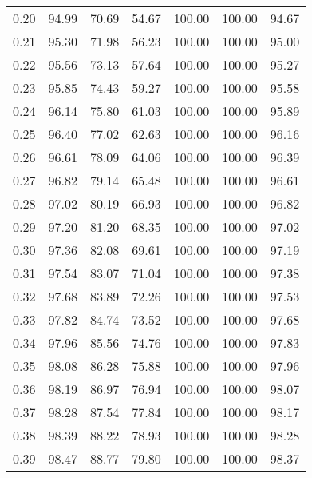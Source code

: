 \begin{tabular}{|c|c|c|c|c|c|c|}
      0.20 &     94.99 &     70.69 &      54.67 &  100.00 &     100.00 &         94.67 \\
      0.21 &     95.30 &     71.98 &      56.23 &  100.00 &     100.00 &         95.00 \\
      0.22 &     95.56 &     73.13 &      57.64 &  100.00 &     100.00 &         95.27 \\
      0.23 &     95.85 &     74.43 &      59.27 &  100.00 &     100.00 &         95.58 \\
      0.24 &     96.14 &     75.80 &      61.03 &  100.00 &     100.00 &         95.89 \\
      0.25 &     96.40 &     77.02 &      62.63 &  100.00 &     100.00 &         96.16 \\
      0.26 &     96.61 &     78.09 &      64.06 &  100.00 &     100.00 &         96.39 \\
      0.27 &     96.82 &     79.14 &      65.48 &  100.00 &     100.00 &         96.61 \\
      0.28 &     97.02 &     80.19 &      66.93 &  100.00 &     100.00 &         96.82 \\
      0.29 &     97.20 &     81.20 &      68.35 &  100.00 &     100.00 &         97.02 \\
      0.30 &     97.36 &     82.08 &      69.61 &  100.00 &     100.00 &         97.19 \\
      0.31 &     97.54 &     83.07 &      71.04 &  100.00 &     100.00 &         97.38 \\
      0.32 &     97.68 &     83.89 &      72.26 &  100.00 &     100.00 &         97.53 \\
      0.33 &     97.82 &     84.74 &      73.52 &  100.00 &     100.00 &         97.68 \\
      0.34 &     97.96 &     85.56 &      74.76 &  100.00 &     100.00 &         97.83 \\
      0.35 &     98.08 &     86.28 &      75.88 &  100.00 &     100.00 &         97.96 \\
      0.36 &     98.19 &     86.97 &      76.94 &  100.00 &     100.00 &         98.07 \\
      0.37 &     98.28 &     87.54 &      77.84 &  100.00 &     100.00 &         98.17 \\
      0.38 &     98.39 &     88.22 &      78.93 &  100.00 &     100.00 &         98.28 \\
      0.39 &     98.47 &     88.77 &      79.80 &  100.00 &     100.00 &         98.37 \\

\end{tabular}
